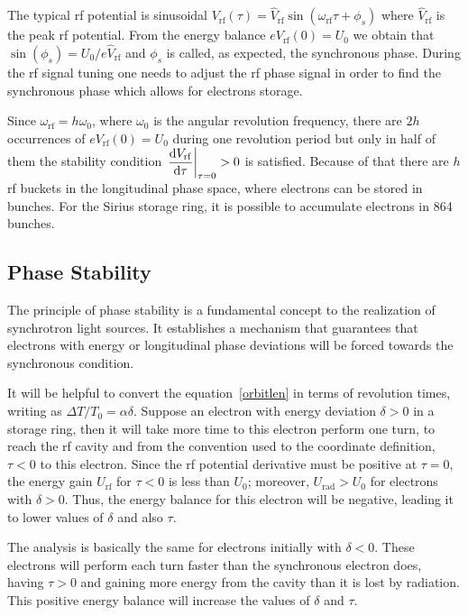 The typical \gls{rf} potential is sinusoidal $V_{\mathrm{rf}}(\tau) = \hat{V}_{\mathrm{rf}} \sin \left(\omega_{\mathrm{rf}}\tau + \phi_s\right)$ where $\hat{V}_{\mathrm{rf}}$ is the peak \gls{rf} potential. From the energy balance $eV_{\mathrm{rf}}(0) = U_0$ we obtain that $\sin(\phi_s) = U_0/e\hat{V}_{\mathrm{rf}}$ and $\phi_s$ is called, as expected, the synchronous phase. During the \gls{rf} signal tuning one needs to adjust the \gls{rf} phase signal in order to find the synchronous phase which allows for electrons storage.

Since $\omega_{\mathrm{rf}} = h \omega_0$, where $\omega_0$ is the angular revolution frequency, there are $2h$ occurrences of $eV_{\mathrm{rf}}(0) = U_0$ during one revolution period but only in half of them the stability condition $\left.\dfrac{\mathrm{d} V_{\mathrm{rf}}}{\mathrm{d} \tau}\right|_{\tau = 0} > 0$ is satisfied. Because of that there are $h$ \gls{rf} buckets in the longitudinal phase space, where electrons can be stored in bunches. For the Sirius storage ring, it is possible to accumulate electrons in 864 bunches.

\subsection{Phase Stability}

The principle of phase stability is a fundamental concept to the realization of synchrotron light sources. It establishes a mechanism that guarantees that electrons with energy or longitudinal phase deviations will be forced towards the synchronous condition.

It will be helpful to convert the equation~\eqref{orbitlen} in terms of revolution times, writing as $\Delta T/T_0 = \alpha \delta$. Suppose an electron with energy deviation $\delta > 0$ in a storage ring, then it will take more time to this electron perform one turn, to reach the \gls{rf} cavity and from the convention used to the coordinate definition, $\tau < 0$ to this electron. Since the \gls{rf} potential derivative must be positive at $\tau = 0$, the energy gain $U_{\mathrm{rf}}$ for $\tau < 0$ is less than $U_0$; moreover, $U_{\mathrm{rad}} > U_0$ for electrons with $\delta > 0$. Thus, the energy balance for this electron will be negative, leading it to lower values of $\delta$ and also $\tau$.

The analysis is basically the same for electrons initially with $\delta < 0$. These electrons will perform each turn faster than the synchronous electron does, having $\tau > 0$ and gaining more energy from the cavity than it is lost by radiation. This positive energy balance will increase the values of $\delta$ and $\tau$.

